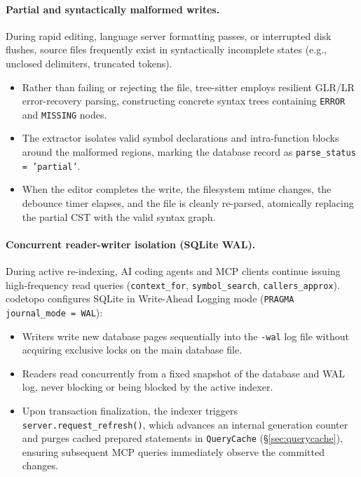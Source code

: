 \paragraph{Partial and syntactically malformed writes.} During rapid editing, language server formatting passes, or
interrupted disk flushes, source files frequently exist in syntactically incomplete states (e.g., unclosed delimiters,
truncated tokens).
\begin{itemize}
  \item Rather than failing or rejecting the file, tree-sitter employs resilient GLR/LR error-recovery parsing,
        constructing concrete syntax trees containing \texttt{ERROR} and \texttt{MISSING} nodes.
  \item The extractor isolates valid symbol declarations and intra-function blocks around the malformed regions,
        marking the database record as \texttt{parse\_status = 'partial'}.
  \item When the editor completes the write, the filesystem mtime changes, the debounce timer elapses, and the
        file is cleanly re-parsed, atomically replacing the partial CST with the valid syntax graph.
\end{itemize}

\paragraph{Concurrent reader-writer isolation (SQLite WAL).} During active re-indexing, AI coding agents and MCP clients
continue issuing high-frequency read queries (\texttt{context\_for}, \texttt{symbol\_search}, \texttt{callers\_approx}).
codetopo configures SQLite in Write-Ahead Logging mode (\texttt{PRAGMA journal\_mode = WAL}):
\begin{itemize}
  \item Writers write new database pages sequentially into the \texttt{-wal} log file without acquiring exclusive
        locks on the main database file.
  \item Readers read concurrently from a fixed snapshot of the database and WAL log, never blocking or being blocked
        by the active indexer.
  \item Upon transaction finalization, the indexer triggers \texttt{server.request\_refresh()}, which advances an internal
        generation counter and purges cached prepared statements in \texttt{QueryCache} (\S\ref{sec:querycache}),
        ensuring subsequent MCP queries immediately observe the committed changes.
\end{itemize}

